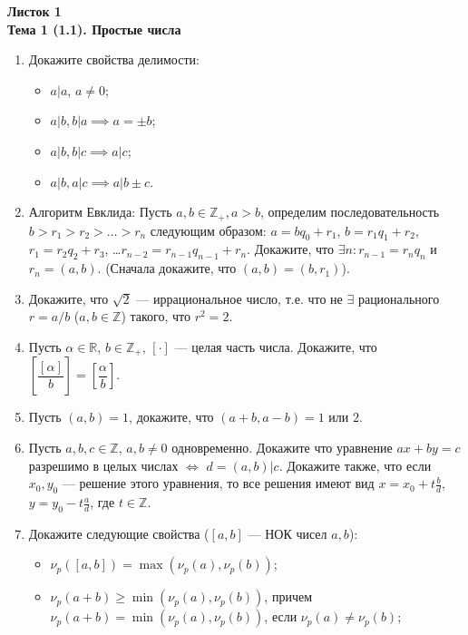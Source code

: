 \documentclass[a4paper, 11pt]{article}
\begin{document}
\begin{center} \Large \bf Листок 1\\ Тема 1 (1.1). Простые числа \end{center}


\begin{enumerate}[topsep=0pt]
    \item Докажите свойства делимости: 
    \begin{itemize}[noitemsep,topsep=0pt]
        \item $a | a$, $a \neq 0$;
        \item $a|b, b|a \implies a=\pm b$;
        \item $a|b, b|c \implies a|c$;
        \item $a|b, a|c \implies a| b\pm c$.
    \end{itemize}
    \item Алгоритм Евклида: Пусть $a,b \in\mathbb{Z}_{+}, a>b$, определим последовательность $b>r_1>r_2>\dots > r_n$ следующим образом: $a=bq_0+r_1$, $b=r_1q_1+r_2$, $r_1=r_2q_2+r_3$, \dots $r_{n-2}=r_{n-1} q_{n-1}+r_n$. Докажите, что $\exists n: r_{n-1}=r_nq_n$ и $r_n=(a,b)$. (Сначала докажите, что $(a,b)=(b,r_1)$).
    \item Докажите, что $\sqrt{2}$ --- иррациональное число, т.е. что не $\exists$ рационального $r=a/b$ ($a,b \in \mathbb{Z}$) такого, что $r^2=2$.
    \item Пусть $\alpha \in \mathbb{R}$, $b\in\mathbb{Z}_+$, $[\cdot]$ --- целая часть числа. Докажите, что $\left[\dfrac{[\alpha]}{b}\right]=\left[\dfrac{\alpha}{b}\right]$.
    \item Пусть $(a,b)=1$, докажите, что $(a+b,a-b)=1$ или $2$.
    \item Пусть $a,b,c \in \mathbb{Z}$, $a,b\neq 0$ одновременно. Докажите что уравнение $ax+by=c$ разрешимо в целых числах $\iff$ $d=(a,b)|c$. Докажите также, что если $x_0,y_0$ --- решение этого уравнения, то все решения имеют вид $x=x_0+t\tfrac{b}{d}$, $y=y_0-t\tfrac{a}{d}$, где $t \in \mathbb{Z}$.
    \item Докажите следующие свойства ($[a,b]$ --- НОК чисел $a,b$):
    \begin{itemize}[noitemsep,topsep=0pt]
        \item $\nu_p([a,b])=\max(\nu_p(a),\nu_p(b))$;
        \item $\nu_p(a+b)\geqslant \min(\nu_p(a),\nu_p(b))$, причем $\nu_p(a+b)= \min(\nu_p(a),\nu_p(b))$, если $\nu_p(a) \neq \nu_p(b)$;

\end{itemize}
\end{enumerate}
\end{document}
